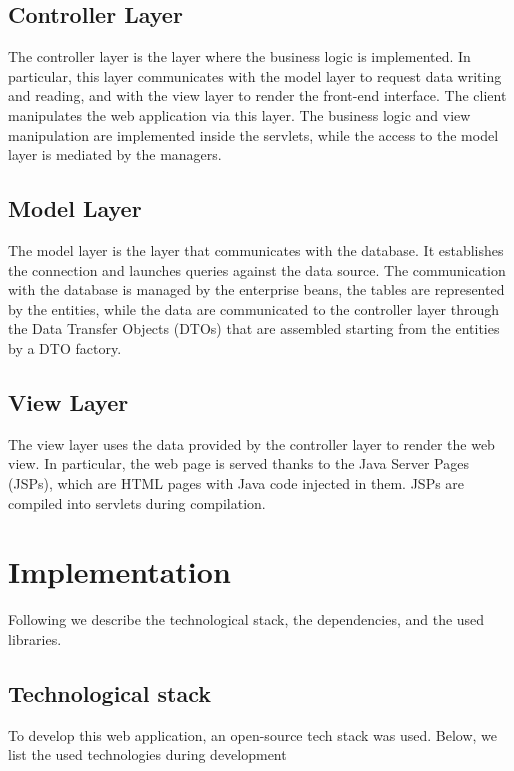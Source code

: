\subsection{Controller Layer}
The controller layer is the layer where the business logic is implemented. In particular, this layer communicates with the model layer to request data writing and reading, and with the view layer to render the front-end interface. The client manipulates the web application via this layer. The business logic and view manipulation are implemented inside the servlets, while the access to the model layer is mediated by the managers.

\subsection{Model Layer}
The model layer is the layer that communicates with the database. It establishes the connection and launches queries against the data source. The communication with the database is managed by the enterprise beans, the tables are represented by the entities, while the data are communicated to the controller layer through the Data Transfer Objects (DTOs) that are assembled starting from the entities by a DTO factory. 

\subsection{View Layer}
\label{ss:viewLayer}
The view layer uses the data provided by the controller layer to render the web view. In particular, the web page is served thanks to the Java Server Pages (JSPs), which are HTML pages with Java code injected in them. JSPs are compiled into servlets during compilation.

\section{Implementation}

Following we describe the technological stack, the dependencies, and the used libraries.

\subsection*{Technological stack}

To develop this web application, an open-source tech stack was used. Below, we list the used technologies during development

